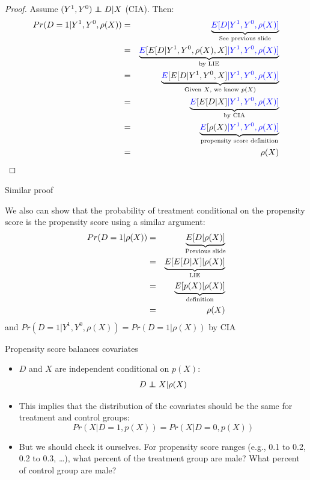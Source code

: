 \documentclass{beamer}
\newcommand\independent{\protect\mathpalette{\protect\independenT}{\perp}}
\def\independenT#1#2{\mathrel{\rlap{$#1#2$}\mkern2mu{#1#2}}}
\begin{document}
\begin{frame}[plain,shrink=5]
	
	\begin{proof}
	Assume $(Y^1,Y^0)\independent{D}|X$ (CIA).  Then:
		\begin{eqnarray*}
		Pr(D=1 | Y^1,Y^0, \rho(X)) &=& \underbrace{\textcolor{blue}{E[D | Y^1, Y^0, \rho(X)]}}_{ \mathclap{\text{See previous slide}}} \\
		&=&\underbrace{\textcolor{blue}{E} [ E [ D | Y^1,Y^0, \rho(X), X] \textcolor{blue}{| Y^1,Y^0,\rho(X)]}}_{ \mathclap{\text{by LIE}}} \\
		&=&\underbrace{\textcolor{blue}{E} [ E [ D | Y^1,Y^0,X] \textcolor{blue}{| Y^1,Y^0,\rho(X)]}}_{ \mathclap{\text{Given $X$, we know $p(X)$}}} \\
		&=&\underbrace{\textcolor{blue}{E} [E [D | X] \textcolor{blue}{| Y^1,Y^0,\rho(X)]}}_{ \mathclap{\text{by CIA}}} \\
		&=& \underbrace{\textcolor{blue}{E}[\rho(X) \textcolor{blue}{| Y^1, Y^0, \rho(X)]}}_{ \mathclap{\text{propensity score definition}}} \\
		&=& \rho(X)
		\end{eqnarray*}
	\end{proof}
	
\end{frame}

\begin{frame}{Similar proof}

	 We also can show that the probability of treatment conditional on the propensity score is the propensity score using a similar argument:
		\begin{eqnarray*}
		Pr(D=1| \rho(X)) &=& \underbrace{E[ D | \rho(X) ]}_{\mathclap{\text{Previous slide}}} \\
		&=& \underbrace{E [ E [D | X] | \rho(X)]}_{ \mathclap{\text{LIE}}} \\
		&=& \underbrace{E[p(X) | \rho(X)]}_{ \mathclap{\text{definition}}} \\
		&=& \rho(X)
		\end{eqnarray*}and $Pr(D=1 | Y^1, Y^0, \rho(X)) = Pr(D=1| \rho(X))$ by CIA
\end{frame}



\begin{frame}{Propensity score balances covariates}
	
	\begin{itemize}
	\item  $D$ and $X$ are independent conditional on $p(X)$: $$D\independent{X} | \rho(X)$$
	\item This implies that the distribution of the covariates should be the same for treatment and control groups: $$Pr(X|D=1,p(X)) = Pr(X|D=0, p(X))$$ 
	\item But we should check it ourselves. For propensity score ranges (e.g., 0.1 to 0.2, 0.2 to 0.3, \dots), what percent of the treatment group are male? What percent of control group are male?
	\end{itemize}
\end{frame}
\end{document}
